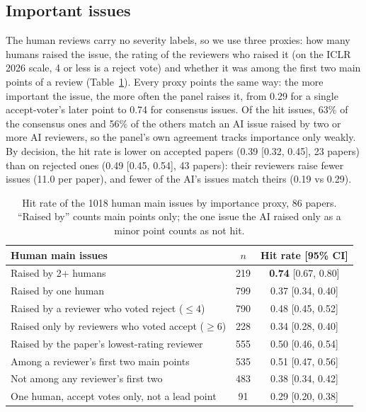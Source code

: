 \documentclass[11pt,a4paper]{article}
\begin{document}
\subsection{Important issues}\label{sec:importance}
The human reviews carry no severity labels, so we use three proxies: how
many humans raised the issue, the rating of the reviewers who raised it (on the ICLR 2026 scale,
4 or less is a reject vote) and whether it was among the first two main points of a review
(Table~\ref{tab:importance}). Every proxy points the same way: the more important the issue, the
more often the panel raises it, from 0.29 for a single accept-voter's later point to 0.74 for
consensus issues. Of the hit issues, 63\% of the consensus ones and 56\% of the others match an
AI issue raised by two or more AI reviewers, so the panel's own agreement tracks importance only
weakly. By decision, the hit rate is lower on accepted papers (0.39 [0.32, 0.45], 23 papers) than
on rejected ones (0.49 [0.45, 0.54], 43 papers): their reviewers raise fewer issues (11.0 per
paper), and fewer of the AI's issues match theirs (0.19 vs 0.29).

\begin{table}[h]
\centering
\small
\caption{Hit rate of the 1018 human main issues by importance proxy, 86 papers. ``Raised by'' counts main points only; the one issue the AI raised only as a minor point counts as not hit.}\label{tab:importance}
\begin{tabular}{lcc}
\toprule
Human main issues & $n$ & Hit rate [95\% CI]\\
\midrule
Raised by 2+ humans & 219 & \textbf{0.74} [0.67, 0.80]\\
Raised by one human & 799 & 0.37 [0.34, 0.40]\\
Raised by a reviewer who voted reject ($\le 4$) & 790 & 0.48 [0.45, 0.52]\\
Raised only by reviewers who voted accept ($\ge 6$) & 228 & 0.34 [0.28, 0.40]\\
Raised by the paper's lowest-rating reviewer & 555 & 0.50 [0.46, 0.54]\\
Among a reviewer's first two main points & 535 & 0.51 [0.47, 0.56]\\
Not among any reviewer's first two & 483 & 0.38 [0.34, 0.42]\\
One human, accept votes only, not a lead point & 91 & 0.29 [0.20, 0.38]\\
\bottomrule
\end{tabular}
\end{table}
\end{document}
